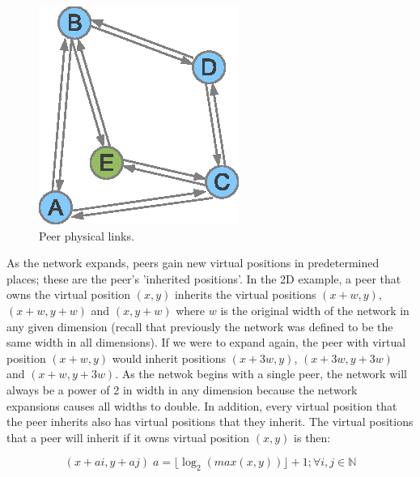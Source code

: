 \documentclass[ %
                    author={Luke Murray},
                supervisor={Dr. Simon Hollis},
                     title={Shadow Peer-to-Peer Networks},
                  subtitle={},
                    degree={MEng},
                      year={2013} ]{thesis}
\begin{document}
\begin{figure}[h]
\begin{minipage}[b]{0.35\linewidth}
        \includegraphics[width=\linewidth]{diagrams/network_join2.eps}
        \caption{Peer physical links.}
        \label{join2}
    \end{minipage}
\end{figure}

As the network expands, peers gain new virtual positions in predetermined places; these are the peer's 'inherited positions'. In the 2D example, a peer that owns the virtual position $(x, y)$ inherits the virtual positions $(x + w, y)$, $(x + w, y + w)$ and $(x, y + w)$ where $w$ is the original width of the network in any given dimension (recall that previously the network was defined to be the same width in all dimensions). If we were to expand again, the peer with virtual position $(x + w, y)$ would inherit positions $(x + 3w, y)$, $(x + 3w, y + 3w)$ and $(x + w, y + 3w)$. As the netwok begins with a single peer, the network will always be a power of 2 in width in any dimension because the network expansions causes all widths to double. In addition, every virtual position that the peer inherits also has virtual positions that they inherit. The virtual positions that a peer will inherit if it owns virtual position $(x, y)$ is then:

\[(x + ai, y + aj)\; a = \lfloor \log_{2}{(max(x,y))} \rfloor + 1; \forall i,j \in \mathbb{N}\]
\end{document}
